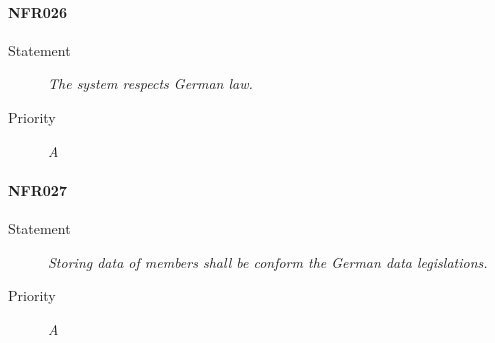 \paragraph{NFR026}
\begin{description}
\item[Statement] \textit{The system respects German law.}
\item[Priority] \textit{A}
\end{description}

\paragraph{NFR027}
\begin{description}
\item [Statement] \textit{Storing data of members shall be conform the German
    data legislations.}
\item [Priority] \textit{A}
\end{description}

